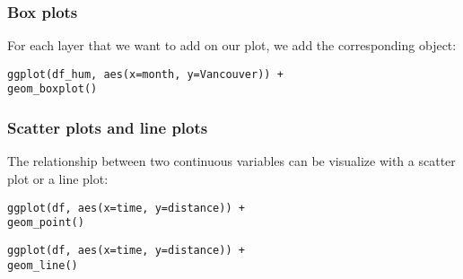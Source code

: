 \documentclass{beamer}
\begin{document}
	\begin{frame}[fragile]
		\frametitle{Box plots}

		For each layer that we want to add on our plot, we add the corresponding object:

		\vspace{2em}

		\begin{exampleblock}{}
		\begin{BVerbatim}
ggplot(df_hum, aes(x=month, y=Vancouver)) + 
geom_boxplot()
		\end{BVerbatim}
		\end{exampleblock}{}
		
	\end{frame}

	\begin{frame}[fragile]
		\frametitle{Scatter plots and line plots}

		The relationship between two continuous variables can be visualize with a scatter plot or a line plot:

		\vspace{2em}

		\begin{exampleblock}{}
		\begin{BVerbatim}
ggplot(df, aes(x=time, y=distance)) +
geom_point()
		\end{BVerbatim}
		\end{exampleblock}{}

		\vspace{2em}

		\begin{exampleblock}{}
		\begin{BVerbatim}
ggplot(df, aes(x=time, y=distance)) +
geom_line()
		\end{BVerbatim}
		\end{exampleblock}{}
		
	\end{frame}
\end{document}
